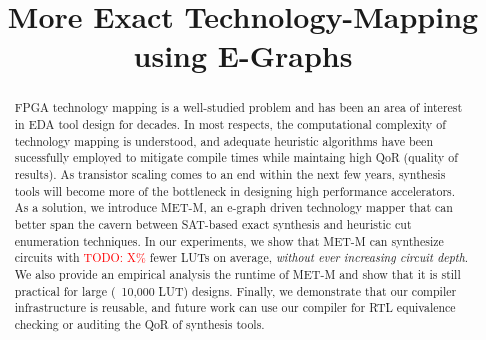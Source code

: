 \documentclass[sigplan,nonacm]{acmart}
\newcommand{\todo}[1]{\textcolor{red}{TODO: #1}}
\newcommand{\fullname}{More Exact Technology-Mapping using E-Graphs}
\newcommand{\shortname}{MET-M}
\begin{document}
\title{\fullname}

\begin{abstract}
    FPGA technology mapping is a well-studied problem and has been an area of interest in EDA tool design for decades.
    In most respects, the computational complexity of technology mapping is understood, and adequate heuristic algorithms have been sucessfully employed to mitigate compile times while maintaing high QoR (quality of results).
    As transistor scaling comes to an end within the next few years, synthesis tools will become more of the bottleneck in designing high performance accelerators. As a solution, we introduce \shortname{}, an e-graph driven technology mapper that can better span the cavern between SAT-based exact synthesis and heuristic cut enumeration techniques.
    In our experiments, we show that \shortname{} can synthesize circuits with \todo{X\%} fewer LUTs on average, \textit{without ever increasing circuit depth}.
    We also provide an empirical analysis the runtime of \shortname{} and show that it is still practical for large (~10,000 LUT) designs.
    Finally, we demonstrate that our compiler infrastructure is reusable, and future work can use our compiler for RTL equivalence checking or auditing the QoR of synthesis tools.
\end{abstract}
\maketitle %








\end{document}
